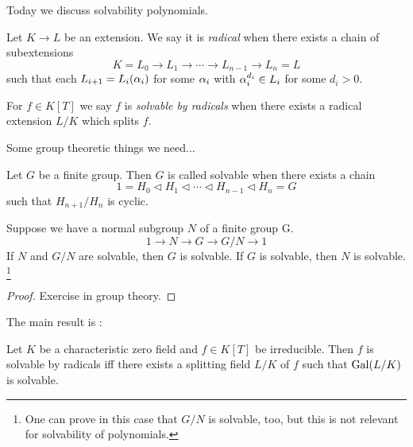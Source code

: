 \documentclass{article}
\begin{document}
Today we discuss solvability polynomials.

\begin{dfn}

  Let $K \to L$ be an extension.
  We say it is \emph{radical} when
  there exists a chain of subextensions 
  \[
    K = L_0 \to L_1 \to \cdots \to L_{n-1} \to L_n = L
  \]
  such that each $L_{i+1} = L_i(\alpha_i)$
  for some $\alpha_i$ with $\alpha_i^{d_i} \in L_i$ for some $d_i > 0$.

  For $f \in K[T]$ we say $f$ is \emph{solvable by radicals} when
  there exists a radical extension $L / K$ which splits $f$.
\end{dfn}

Some group theoretic things we need... 

\begin{dfn}
  
  Let $G$ be a finite group.
  Then $G$ is called solvable when
  there exists a chain \[
    1 = H_0 \triangleleft H_1 \triangleleft
    \cdots \triangleleft H_{n-1} \triangleleft H_n = G
  \]
  such that $H_{n+1} / H_n$ is cyclic.
\end{dfn}

\begin{prop}
  
  Suppose we have a normal subgroup $N$ of a finite group G.
  \[
    1 \to N \to G \to G / N \to 1
  \]
  If $N$ and $G / N$ are solvable, then $G$ is solvable.
  If $G$ is solvable, then $N$ is solvable.
  \footnote{
    One can prove in this case that $G / N$ is solvable, too,
    but this is not relevant for solvability of polynomials.
  }
\end{prop}
\begin{proof}
  Exercise in group theory.
\end{proof}

The main result is : 
\begin{prop}
  
  Let $K$ be a characteristic zero field and $f \in K[T]$ be irreducible.
  Then $f$ is solvable by radicals iff 
  there exists a splitting field $L / K$ of $f$
  such that $\operatorname{Gal}(L / K)$ is solvable.
\end{prop}
\end{document}
